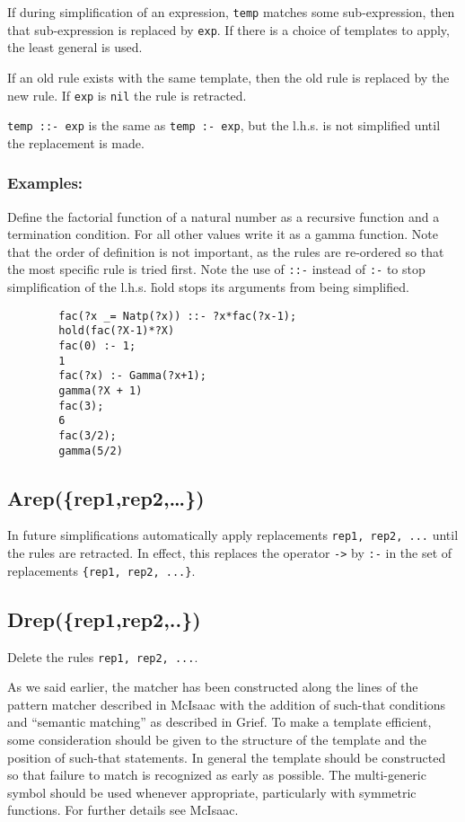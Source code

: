 If during simplification of an expression, \texttt{temp} matches some
sub-expression, then that sub-expression is replaced by \texttt{exp}.  If there
is a choice of templates to apply, the least general is used.

If an old rule exists with the same template, then the old rule is replaced by
the new rule.  If \texttt{exp} is \texttt{nil} the rule is retracted.

\texttt{temp ::- exp} is the same as \texttt{temp :- exp}, but the l.h.s. is not
simplified until the replacement is made.

\subsubsection*{Examples:}

Define the factorial function of a natural number as a recursive function and a
termination condition.  For all other values write it as a gamma function.  Note
that the order of definition is not important, as the rules are re-ordered so
that the most specific rule is tried first.  Note the use of \texttt{::-}
instead of \texttt{:-} to stop simplification of the l.h.s.  \f{hold} stops
its arguments from being simplified.
\begin{verbatim}
        fac(?x _= Natp(?x)) ::- ?x*fac(?x-1);
        hold(fac(?X-1)*?X)
        fac(0) :- 1;
        1
        fac(?x) :- Gamma(?x+1);
        gamma(?X + 1)
        fac(3);
        6
        fac(3/2);
        gamma(5/2)
\end{verbatim}



\subsection{Arep(\{rep1,rep2,\ldots\})}

In future simplifications automatically apply replacements \texttt{rep1, rep2,
  ...} until the rules are retracted.  In effect, this replaces the operator
\texttt{->} by \texttt{:-} in the set of replacements \texttt{\{rep1, rep2,
  ...\}}.


\subsection{Drep(\{rep1,rep2,..\})}

Delete the rules \texttt{rep1, rep2, ...}.

As we said earlier, the matcher has been constructed along the lines of the
pattern matcher described in McIsaac with the addition of such-that conditions
and ``semantic matching'' as described in Grief.  To make a template efficient,
some consideration should be given to the structure of the template and the
position of such-that statements.  In general the template should be constructed
so that failure to match is recognized as early as possible.  The multi-generic
symbol should be used whenever appropriate, particularly with symmetric
functions.  For further details see McIsaac.


